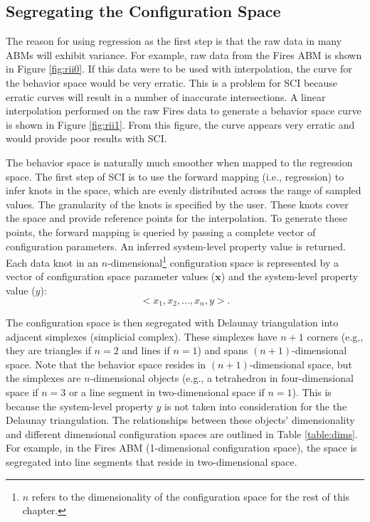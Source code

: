 \subsection{Segregating the Configuration Space}
The reason for using regression as the first step is that the raw data in many ABMs will exhibit variance.
For example, raw data from the Fires ABM is shown in Figure \ref{fig:rii0}.
If this data were to be used with interpolation, the curve for the behavior space would be very erratic.
This is a problem for SCI because erratic curves will result in a number of inaccurate intersections.
A linear interpolation performed on the raw Fires data to generate a behavior space curve is shown in Figure \ref{fig:rii1}.
From this figure, the curve appears very erratic and would provide poor results with SCI.


The behavior space is naturally much smoother when mapped to the regression space.
The first step of SCI is to use the forward mapping (i.e., regression) to infer knots in the space, which are evenly distributed across the range of sampled values.
The granularity of the knots is specified by the user.
These knots cover the space and provide reference points for the interpolation.
To generate these points, the forward mapping is queried by passing a complete vector of configuration parameters.
An inferred system-level property value is returned.
Each data knot in an $n$-dimensional\footnote{$n$ refers to the dimensionality of the configuration space for the rest of this chapter.}  configuration space is represented by a vector of configuration space parameter values ($\mathbf x$) and the system-level property value ($y$):
\[<x_1, x_2, ..., x_n, y>.\]

The configuration space is then segregated with Delaunay triangulation \cite{delaunay1934sphere} into adjacent simplexes (simplicial complex).
These simplexes have $n + 1$ corners (e.g., they are triangles if $n=2$ and lines if $n=1$) and spans $(n+1)$-dimensional space.
Note that the behavior space resides in $(n+1)$-dimensional space, but the simplexes are $n$-dimensional objects (e.g., a tetrahedron in four-dimensional space if $n=3$ or a line segment in two-dimensional space if $n=1$).
This is because the system-level property $y$ is not taken into consideration for the the Delaunay triangulation.
The relationships between these objects' dimensionality and different dimensional configuration spaces are outlined in Table \ref{table:dims}.
For example, in the Fires ABM (1-dimensional configuration space), the space is segregated into line segments that reside in two-dimensional space.

